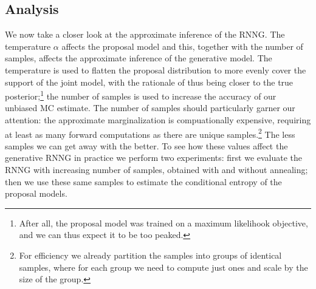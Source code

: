   \subsection{Analysis}
    We now take a closer look at the approximate inference of the RNNG. The temperature $\alpha$ affects the proposal model and this, together with the number of samples, affects the approximate inference of the generative model. The temperature is used to flatten the proposal distribution to more evenly cover the support of the joint model, with the rationale of thus being closer to the true posterior;\footnote{After all, the proposal model was trained on a maximum likelihook objective, and we can thus expect it to be too peaked.} the number of samples is used to increase the accuracy of our unbiased MC estimate. The number of samples should particularly garner our attention: the approximate marginalization is compuationally expensive, requiring at least as many forward computations as there are unique samples.\footnote{For efficiency we already partition the samples into groups of identical samples, where for each group we need to compute just ones and scale by the size of the group.} The less samples we can get away with the better. To see how these values affect the generative RNNG in practice we perform two experiments: first we evaluate the RNNG with increasing number of samples, obtained with and without annealing; then we use these same samples to estimate the conditional entropy of the proposal models.

